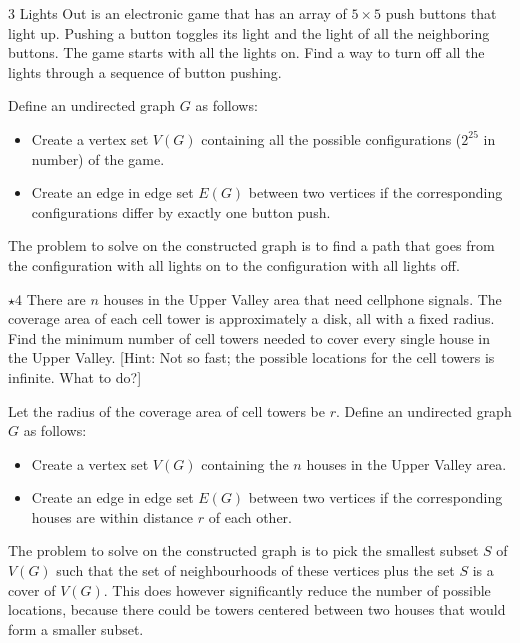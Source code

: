 \documentclass[12pt]{article}
\begin{document}
\newpage 

\begin{problem}{3}
    Lights Out is an electronic game that has an array of $5 \times 5$ push buttons that light up. Pushing a button toggles its light and the light of all the neighboring buttons. The game starts with all the lights on. Find a way to turn off all the lights through a sequence of button pushing.
\end{problem}

\begin{solution}
    \bbni

     Define an undirected graph $G$ as follows: 
    \begin{itemize}
        \item Create a vertex set $V(G)$ containing all the possible configurations ($2^{25}$ in number) of the game. 
        \item Create an edge in edge set $E(G)$ between two vertices if the corresponding configurations differ by exactly one button push.
    \end{itemize}
    The problem to solve on the constructed graph is to find a path that goes from the configuration with all lights on to the configuration with all lights off. 
\end{solution}

\bbni

\begin{problem}{$\star$4}
    There are $n$ houses in the Upper Valley area that need cellphone signals. The coverage area of each cell tower is approximately a disk, all with a fixed radius. Find the minimum number of cell towers needed to cover every single house in the Upper Valley. [Hint: Not so fast; the possible locations for the cell towers is infinite. What to do?]
\end{problem}

\begin{solution}
    \bbni 

    Let the radius of the coverage area of cell towers be $r$. Define an undirected graph $G$ as follows: 
    \begin{itemize}
        \item Create a vertex set $V(G)$ containing the $n$ houses in the Upper Valley area. 
        \item Create an edge in edge set $E(G)$ between two vertices if the corresponding houses are within distance $r$ of each other. 
    \end{itemize}
    The problem to solve on the constructed graph is to pick the smallest subset $S$ of $V(G)$ such that the set of neighbourhoods of these vertices plus the set $S$ is a cover of $V(G)$. This does however significantly reduce the number of possible locations, because there could be towers centered between two houses that would form a smaller subset. 
\end{solution}
\end{document}
